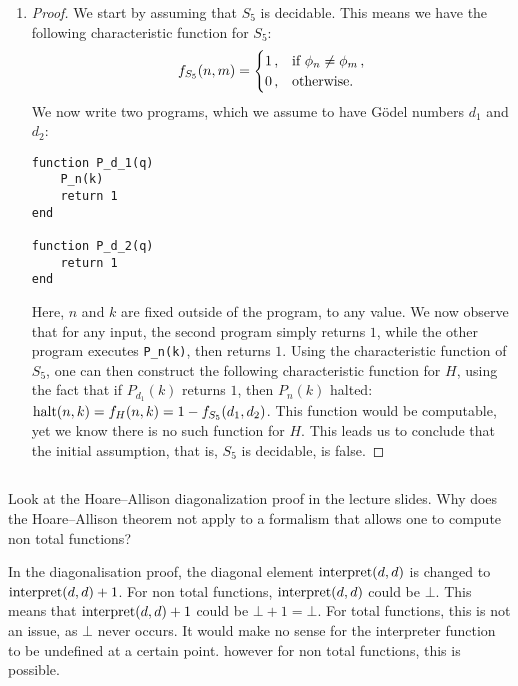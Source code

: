 \begin{solution}
\begin{enumerate}
\begin{proof}
(and hence \(\phi_d\) is not a non total function), then \(P_n(k)\) also halted:
\(\halt(n, k) = f_H(n, k) = 1 - f_{S_4}(d)\).
This function would be computable,
yet we know there is no such function for \(H\).
This leads us to conclude that the initial assumption, that is,
\(S_4\) is decidable, is false.
\end{proof}
\item
\begin{proof}
We start by assuming that \(S_5\) is decidable.
This means we have the following characteristic function for \(S_5\):
\[
f_{S_5}(n, m) =
\begin{cases}
1\,, & \textnormal{if } \phi_n \ne \phi_m\,,\\
0\,, & \textnormal{otherwise.}
\end{cases}
\]
We now write two programs,
which we assume to have Gödel numbers \(d_1\) and \(d_2\):
\begin{verbatim}
function P_d_1(q)
	P_n(k)
	return 1
end

function P_d_2(q)
	return 1
end
\end{verbatim}
Here, \(n\) and \(k\) are fixed outside of the program, to any value.
We now observe that for any input,
the second program simply returns \(1\),
while the other program executes \texttt{P_n(k)},
then returns \(1\).
Using the characteristic function of \(S_5\),
one can then construct the following characteristic function for \(H\),
using the fact that if \(P_{d_1}(k)\) returns \(1\), then \(P_n(k)\) halted:
\(\mathrm{halt}(n, k) = f_H(n, k) = 1 - f_{S_5}(d_1, d_2)\).
This function would be computable,
yet we know there is no such function for \(H\).
This leads us to conclude that the initial assumption, that is,
\(S_5\) is decidable, is false.
\end{proof}
\end{enumerate}
\end{solution}

\subsection{} %
Look at the Hoare--Allison diagonalization proof in the lecture slides.
Why does the Hoare--Allison theorem not apply to a formalism
that allows one to compute non total functions?

\begin{solution}
	In the diagonalisation proof,
	the diagonal element \(\mathrm{interpret}(d, d)\)
	is changed to \(\mathrm{interpret}(d, d) + 1\).
	For non total functions, \(\mathrm{interpret}(d, d)\) could be \(\bot\).
	This means that \(\mathrm{interpret}(d, d) + 1\) could be \(\bot + 1 = \bot\).
	For total functions, this is not an issue,
	as \(\bot\) never occurs.
	It would make no sense for the interpreter function
	to be undefined at a certain point.
	however for non total functions, this is possible.
\end{solution}

